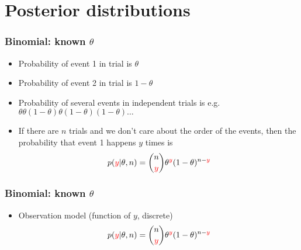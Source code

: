 \documentclass[10pt]{beamer}
\begin{document}
\section{Posterior distributions}

\begin{frame}
  \frametitle{Binomial: known $\theta$}

  \begin{itemize}
  \item Probability of event 1 in trial is $\theta$
  \item<2-> Probability of event 2 in trial is $1-\theta$
  \item<3-> Probability of several events in independent trials is e.g.\\
    $\theta\theta(1-\theta)\theta(1-\theta)(1-\theta)\ldots$
  \item<4-> If there are $n$ trials and we don't care about the order
    of the events, then the probability that event 1 happens {\color{red}$y$} times
    is
    \begin{align*}
      p({\color{red}y}|\theta,n) = \binom{n}{{\color{red}y}} \theta^{\color{red}y}(1-\theta)^{n-{\color{red}y}}
    \end{align*}
  \end{itemize}

\end{frame}

\begin{frame}
  \frametitle{Binomial: known $\theta$}

  \begin{itemize}
  \item {\color{blue}Observation model} (function of {\color{red} $y$}, discrete)
    \begin{align*}
      p({\color{red}y}|\theta,n) = \binom{n}{{\color{red}y}} \theta^{\color{red}y}(1-\theta)^{n-{\color{red}y}}
    \end{align*}
  \end{itemize}

  \begin{center}
  \end{center}
\end{frame}
\end{document}
